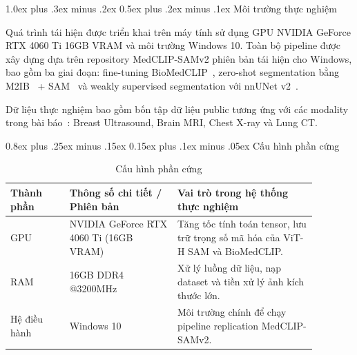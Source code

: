 \documentclass[conference]{IEEEtran}
\makeatletter
\def\section{\@startsection{section}{1}{\z@}%
  {1.0ex plus .3ex minus .2ex}%
  {0.5ex plus .2ex minus .1ex}%
  {\reset@font\normalsize\bfseries\centering}}%
\def\subsection{\@startsection{subsection}{2}{\z@}%
  {0.8ex plus .25ex minus .15ex}%
  {0.15ex plus .1ex minus .05ex}%
  {\reset@font\normalsize\itshape}}%
\makeatother
\begin{document}
\section{Môi trường thực nghiệm}
\label{sec:moitruong}

Quá trình tái hiện được triển khai trên máy tính sử dụng GPU NVIDIA GeForce RTX 4060 Ti 16GB VRAM và môi trường Windows 10. Toàn bộ pipeline được xây dựng dựa trên repository MedCLIP-SAMv2 phiên bản tái hiện cho Windows, bao gồm ba giai đoạn: fine-tuning BioMedCLIP~\cite{ref3}, zero-shot segmentation bằng M2IB~\cite{ref7} + SAM~\cite{ref2,ref4} và weakly supervised segmentation với nnUNet v2~\cite{ref1}.

Dữ liệu thực nghiệm bao gồm bốn tập dữ liệu public tương ứng với các modality trong bài báo~\cite{ref1}: Breast Ultrasound, Brain MRI, Chest X-ray và Lung CT.

\subsection{Cấu hình phần cứng}
\begin{table}[H]
\centering
\small
\caption{Cấu hình phần cứng}
\label{tab:hardware}
\begin{tabular}{|>{\raggedright\arraybackslash}p{0.17\linewidth}|>{\raggedright\arraybackslash}p{0.31\linewidth}|>{\raggedright\arraybackslash}p{0.40\linewidth}|}
\hline
\textbf{Thành phần} & \textbf{Thông số chi tiết / Phiên bản} & \textbf{Vai trò trong hệ thống thực nghiệm} \\
\hline
GPU & NVIDIA GeForce RTX 4060 Ti (16GB VRAM) & Tăng tốc tính toán tensor, lưu trữ trọng số mã hóa của ViT-H SAM và BioMedCLIP. \\
\hline
RAM & 16GB DDR4 @3200MHz & Xử lý luồng dữ liệu, nạp dataset và tiền xử lý ảnh kích thước lớn. \\
\hline
Hệ điều hành & Windows 10 & Môi trường chính để chạy pipeline replication MedCLIP-SAMv2. \\
\hline
\end{tabular}
\end{table}
\end{document}
